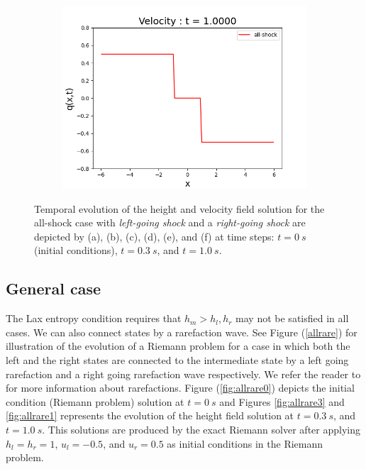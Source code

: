 \documentclass[10pt,a4paper]{article}
\newcommand{\Fig}[1]{Figure (\ref{fig:#1})}
\begin{document}
\begin{figure}[H]
\begin{subfigure}{0.33\textwidth}
			\includegraphics[width=\linewidth]{images/allshockv1}
			\caption{}
			\label{fig:allshockv1}
		\end{subfigure}
		\caption{Temporal evolution of the height and velocity field solution for the all-shock case with {\em left-going shock} and a {\em right-going shock}  are depicted by (a), (b), (c), (d), (e), and (f) at time steps: $t=0~s$ (initial conditions), $t = 0.3~s$, and $t = 1.0~s$. }
		\label{fig:allshock}
	\end{figure}
	
	\subsection{General case}
	The Lax entropy condition requires that $h_m > h_l, h_r$ may not be satisfied in all cases.  We can also connect states by a rarefaction wave. See Figure (\ref{allrare})  for illustration of the evolution of a Riemann problem  for a case in which both the left and  the right states are connected to the intermediate state by a left going rarefaction and a right going rarefaction wave  respectively.   We refer the reader to   \citet{leveque2002finite} for more information about rarefactions.  \Fig{allrare0} depicts the initial condition (Riemann problem) solution at  $t=0~s$  and Figures \ref{fig:allrare3} and \ref{fig:allrare1} represents the evolution of the height field solution at $t = 0.3~s$, and $t = 1.0~s$.  This solutions are produced by the exact Riemann solver after applying $h_l = h_r = 1$, $u_l  =  -0.5$, and $u_r = 0.5$ as initial conditions in  the Riemann problem.
	
\end{document}
